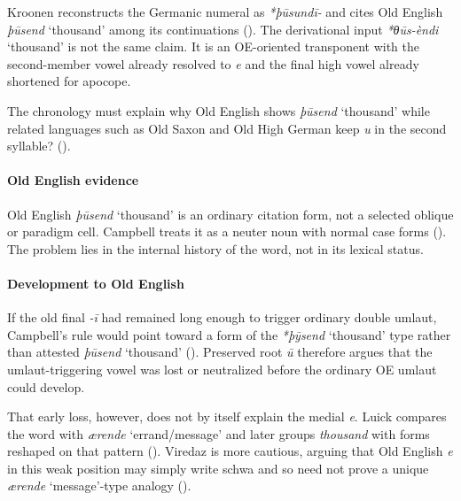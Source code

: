 \documentclass[
  british,
  a4paper,
]{article}
\providecommand{\Recon}[1]{\emph{*#1}}
\begin{document}
Kroonen reconstructs the Germanic numeral as {\emph{*þūsundī-}} and
cites Old English {\emph{þūsend}} `thousand' among its continuations
(). The derivational input
\Recon{θūs-èndi} `thousand' is not the same claim. It is an OE-oriented
transponent with the second-member vowel already resolved to \emph{e}
and the final high vowel already shortened for apocope.

The chronology must explain why Old English shows {\emph{þūsend}}
`thousand' while related languages such as Old Saxon and Old High German
keep \emph{u} in the second syllable?
().

\paragraph{Old English evidence}\label{old-english-evidence-118}

Old English \emph{þūsend} `thousand' is an ordinary citation form, not a
selected oblique or paradigm cell. Campbell treats it as a neuter noun
with normal case forms (). The problem lies in the internal history of the word, not in its
lexical status.

\paragraph{Development to Old
English}\label{development-to-old-english-116}

If the old final \emph{-ī} had remained long enough to trigger ordinary
double umlaut, Campbell's rule would point toward a form of the
{\emph{*þȳsend}} `thousand' type rather than attested {\emph{þūsend}}
`thousand' ().
Preserved root \emph{ū} therefore argues that the umlaut-triggering
vowel was lost or neutralized before the ordinary OE umlaut could
develop.

That early loss, however, does not by itself explain the medial
\emph{e}. Luick compares the word with {\emph{ærende}} `errand/message'
and later groups \emph{thousand} with forms reshaped on that pattern
(). Viredaz
is more cautious, arguing that Old English \emph{e} in this weak
position may simply write schwa and so need not prove a unique
\emph{ærende} `message'-type analogy
().
\end{document}
